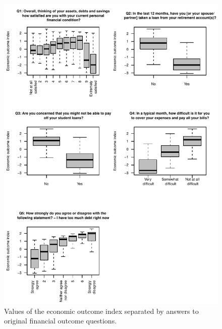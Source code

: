 \documentclass[12pt]{article}
\theoremstyle{plain}
\begin{document}
\begin{figure}[H]
\centering
\caption{Values of the economic outcome index separated by answers to original financial outcome questions.}
	\centerline{\includegraphics[scale=1.2]{biplots.pdf}}
\end{figure}



\clearpage
\newpage 
\renewcommand{\bibsep}{0.5pt}


\begin{spacing}{1.2}
%



\end{spacing}
\end{document}
